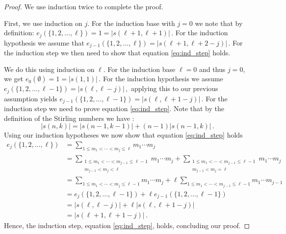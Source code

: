 \begin{proof}
We use induction twice to complete the proof.

First, we use induction on $j$.
For the induction base with $j=0$ we note that by definition:
$e_j(\{ 1, 2, \dots, \ell \}) = 1 = |s(\ell+1, \ell+1)| \,.$
For the induction hypothesis we assume that
$e_{j-1} ( \{ 1, 2, \dots, \ell \}) = |s(\ell+1, \ell+2-j)| \,.$
For the induction step we then need to show that equation \ref{eq:ind_step} holds.

We do this using induction on $\ell$.
For the induction base $\ell=0$ and thus $j=0$, we get
$e_0 ( \emptyset ) = 1 = |s(1, 1)|\,.$
For the induction hypothesis we assume
$e_j (\{ 1, 2, \dots, \ell-1 \}) = |s(\ell, \ell-j)| \,, \nonumber$
applying this to our previous assumption yields
$e_{j-1} (\{ 1, 2, \dots, \ell-1 \}) = |s(\ell, \ell+1-j)| \,.$
For the induction step we need to prove equation \ref{eq:ind_step}.
Note that by the definition of the Stirling numbers we have \cite[equation 15]{stirling_def}:
\begin{equation}
    |s(n,k)| = |s(n-1, k-1)| + (n-1) |s(n-1, k)| \,. \nonumber
\end{equation}
Using our induction hypotheses we now show that equation \ref{eq:ind_step} holds
\begin{align}
    e_j(\{ 1, 2, \dots, \ell \}) &= \sum_{1 \leq m_1 < \cdots < m_{j} \leq \ell} m_1 \cdots m_j \nonumber \\
                                 &= \sum_{\substack{1 \leq m_1 < \cdots < m_{j-1} \leq \ell-1 \\ m_{j-1} < m_j < \ell}} m_1 \cdots m_j + \sum_{\substack{1 \leq m_1 < \cdots < m_{j-1} \leq \ell-1 \\ m_{j-1} < m_j = \ell}} m_1 \cdots m_j \nonumber \\
                                 &= \sum_{1 \leq m_1 < \cdots < m_{j} \leq \ell-1} m_1 \cdots m_j + \ell \sum_{1 \leq m_1 < \cdots < m_{j-1} \leq \ell-1} m_1 \cdots m_{j-1} \nonumber \\
                                 &= e_j(\{ 1, 2, \dots, \ell-1 \}) + \ell e_{j-1}(\{ 1, 2, \dots, \ell-1 \}) \nonumber \\
                                 &= |s(\ell, \ell-j)| + \ell |s(\ell, \ell+1-j)| \nonumber \\
                                 &= |s(\ell+1, \ell+1-j)|\,. \nonumber
\end{align}
Hence, the induction step, equation \ref{eq:ind_step}, holds, concluding our proof.
\end{proof}




